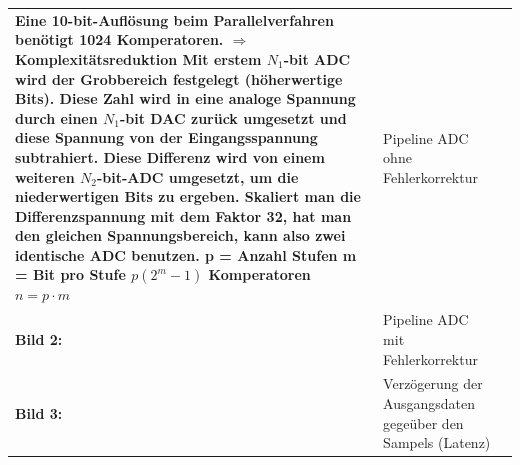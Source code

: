\begin{longtable}{|>{\bfseries}p{4cm}|p{6cm}|p{8cm}|}
    Eine 10-bit-Auflösung beim Parallelverfahren benötigt 1024 Komperatoren. $\Rightarrow$Komplexitätsreduktion \newline
    Mit erstem $N_{1}$-bit ADC wird der Grobbereich festgelegt (höherwertige
    Bits). Diese Zahl wird in eine analoge Spannung durch einen $N_{1}$-bit DAC zurück
    umgesetzt und diese Spannung von der Eingangsspannung subtrahiert. Diese
    Differenz wird von einem weiteren $N_{2}$-bit-ADC umgesetzt, um die
    niederwertigen Bits zu ergeben. Skaliert man die Differenzspannung mit dem
    Faktor 32, hat man den gleichen Spannungsbereich, kann also zwei identische
    ADC benutzen. \newline
    p = Anzahl Stufen \newline
    m = Bit pro Stufe \newline
    $p(2^m-1)$ Komperatoren \newline
    $n = p \cdot m$ \newline
    \newline
    \begin{tabular}{lp{6cm}}
      Bild 1: & Pipeline ADC ohne Fehlerkorrektur \\
      Bild 2: & Pipeline ADC mit Fehlerkorrektur \\
      Bild 3: & Verzögerung der Ausgangsdaten gegeüber den Sampels (Latenz)
    \end{tabular} \\
  \hline
\end{longtable}


